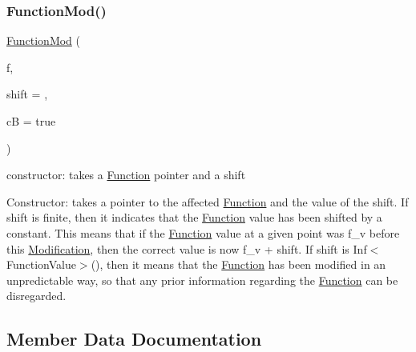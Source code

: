 \subsubsection{\texorpdfstring{Function\+Mod()}{FunctionMod()}}
{\footnotesize\ttfamily \mbox{\hyperlink{class_s_m_spp__di__unipi__it_1_1_function_mod}{Function\+Mod}} (\begin{DoxyParamCaption}\item[{\mbox{\hyperlink{class_s_m_spp__di__unipi__it_1_1_function}{Function}} $\ast$const}]{f,  }\item[{const \mbox{\hyperlink{class_s_m_spp__di__unipi__it_1_1_function_mod_a44f54e31f9fa8a29194218c234876284}{Function\+Value}}}]{shift = {},  }\item[{const bool}]{cB = {\ttfamily true} }\end{DoxyParamCaption})\hspace{0.3cm}{\ttfamily [inline]}}



constructor\+: takes a \mbox{\hyperlink{class_s_m_spp__di__unipi__it_1_1_function}{Function}} pointer and a shift 

Constructor\+: takes a pointer to the affected \mbox{\hyperlink{class_s_m_spp__di__unipi__it_1_1_function}{Function}} and the value of the shift. If shift is finite, then it indicates that the \mbox{\hyperlink{class_s_m_spp__di__unipi__it_1_1_function}{Function}} value has been shifted by a constant. This means that if the \mbox{\hyperlink{class_s_m_spp__di__unipi__it_1_1_function}{Function}} value at a given point was f\+\_\+v before this \mbox{\hyperlink{class_s_m_spp__di__unipi__it_1_1_modification}{Modification}}, then the correct value is now f\+\_\+v + shift. If shift is Inf$<$\+Function\+Value$>$(), then it means that the \mbox{\hyperlink{class_s_m_spp__di__unipi__it_1_1_function}{Function}} has been modified in an unpredictable way, so that any prior information regarding the \mbox{\hyperlink{class_s_m_spp__di__unipi__it_1_1_function}{Function}} can be disregarded. 

\subsection{Member Data Documentation}
\mbox{\label{class_s_m_spp__di__unipi__it_1_1_function_mod_a177a0111cf0d0fdc5409df06c3b5e282}} 
